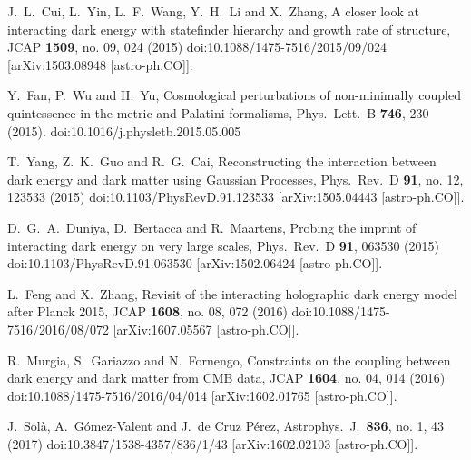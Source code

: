 \documentclass[aps,prd,nofootinbib,amsmath,amssymb,superscriptaddress,twocolumn,10pt]{revtex4}%
\begin{document}
\begin{thebibliography}{99}
  J.~L.~Cui, L.~Yin, L.~F.~Wang, Y.~H.~Li and X.~Zhang,
  A closer look at interacting dark energy with statefinder hierarchy and growth rate of structure,
  JCAP {\bf 1509}, no. 09, 024 (2015)
  doi:10.1088/1475-7516/2015/09/024
  [arXiv:1503.08948 [astro-ph.CO]].

  Y.~Fan, P.~Wu and H.~Yu,
  Cosmological perturbations of non-minimally coupled quintessence in the metric and Palatini formalisms,
  Phys.\ Lett.\ B {\bf 746}, 230 (2015).
  doi:10.1016/j.physletb.2015.05.005

  T.~Yang, Z.~K.~Guo and R.~G.~Cai,
  Reconstructing the interaction between dark energy and dark matter using Gaussian Processes,
  Phys.\ Rev.\ D {\bf 91}, no. 12, 123533 (2015)
  doi:10.1103/PhysRevD.91.123533
  [arXiv:1505.04443 [astro-ph.CO]].

  D.~G.~A.~Duniya, D.~Bertacca and R.~Maartens,
  Probing the imprint of interacting dark energy on very large scales,
  Phys.\ Rev.\ D {\bf 91}, 063530 (2015)
  doi:10.1103/PhysRevD.91.063530
  [arXiv:1502.06424 [astro-ph.CO]].

  L.~Feng and X.~Zhang,
  Revisit of the interacting holographic dark energy model after Planck 2015,
  JCAP {\bf 1608}, no. 08, 072 (2016)
  doi:10.1088/1475-7516/2016/08/072
  [arXiv:1607.05567 [astro-ph.CO]].

  R.~Murgia, S.~Gariazzo and N.~Fornengo,
  Constraints on the coupling between dark energy and dark matter from CMB data,
  JCAP {\bf 1604}, no. 04, 014 (2016)
  doi:10.1088/1475-7516/2016/04/014
  [arXiv:1602.01765 [astro-ph.CO]].

  J.~Solà, A.~Gómez-Valent and J.~de Cruz Pérez,
  Astrophys.\ J.\  {\bf 836}, no. 1, 43 (2017)
  doi:10.3847/1538-4357/836/1/43
  [arXiv:1602.02103 [astro-ph.CO]].



\end{thebibliography}
\end{document}
